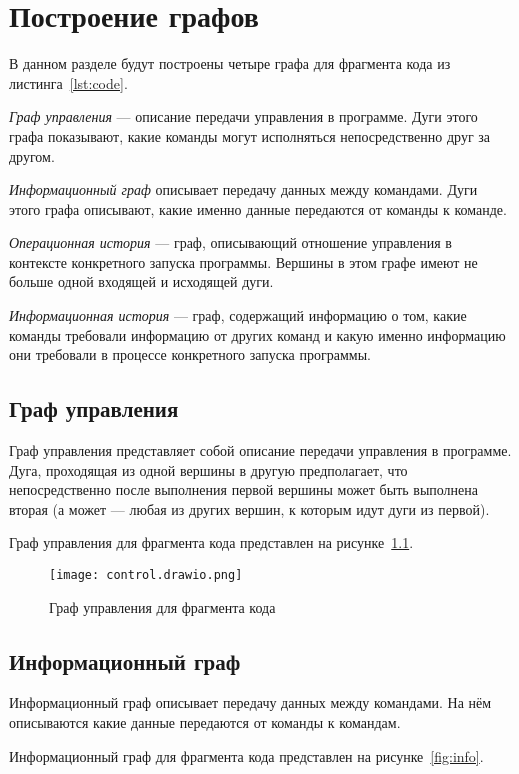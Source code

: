\chapter{Построение графов}

В данном разделе будут построены четыре графа для фрагмента кода из листинга~\ref{lst:code}.

\emph{Граф управления} --- описание передачи управления в программе. Дуги этого графа показывают, какие команды могут исполняться непосредственно друг за другом.

\emph{Информационный граф} описывает передачу данных между командами. Дуги этого графа описывают, какие именно данные передаются от команды к команде.

\emph{Операционная история} --- граф, описывающий отношение управления в контексте конкретного запуска программы. Вершины в этом графе имеют не больше одной входящей и исходящей дуги.

\emph{Информационная история} --- граф, содержащий информацию о том, какие команды требовали информацию от других команд и какую именно информацию они требовали в процессе конкретного запуска программы. 

\section{Граф управления}

Граф управления представляет собой описание передачи управления в программе. Дуга, проходящая из одной вершины в другую предполагает, что непосредственно после выполнения первой вершины может быть выполнена вторая (а может --- любая из других вершин, к которым идут дуги из первой). 

Граф управления для фрагмента кода представлен на рисунке~\ref{fig:control}.

\begin{figure}[h!]
  \texttt{[image: control.drawio.png]}
  \caption{Граф управления для фрагмента кода}
  \label{fig:control}
\end{figure}

\section{Информационный граф}

Информационный граф описывает передачу данных между командами. На нём описываются какие данные передаются от команды к командам.

Информационный граф для фрагмента кода представлен на рисунке~\ref{fig:info}.

